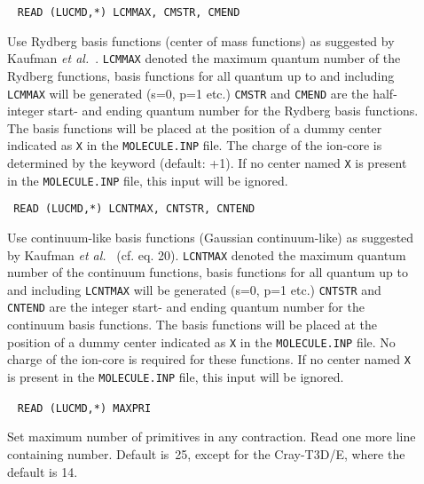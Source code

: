 \begin{description}
\item[]\verb| |\newline
\verb|READ (LUCMD,*) LCMMAX, CMSTR, CMEND|

Use Rydberg basis functions
(center of mass functions) as suggested by
Kaufman {\it et al.\/}~\cite{kkwbmjjpbamop22}. \verb|LCMMAX| denoted
the maximum quantum number of the Rydberg functions, basis functions
for all quantum up to and including \verb|LCMMAX| will be generated
(s=0, p=1 etc.) \verb|CMSTR| and \verb|CMEND| are the half-integer
start- and ending quantum number for the Rydberg basis functions. The
basis functions will be placed at the position of a dummy center
indicated as \verb|X| in the \verb|MOLECULE.INP| file. The charge of
the ion-core is determined by the keyword  (default: +1).
If no center named \verb|X| is present in the \verb|MOLECULE.INP| file,
this input will be ignored.

\item[]\verb| |\newline
\verb|READ (LUCMD,*) LCNTMAX, CNTSTR, CNTEND|

%
%
Use continuum-like basis functions
(Gaussian continuum-like) as suggested by
Kaufman {\it et al.\/}~\cite{kkwbmjjpbamop22} (cf. eq. 20). \verb|LCNTMAX| denoted
the maximum quantum number of the continuum functions, basis functions
for all quantum up to and including \verb|LCNTMAX| will be generated
(s=0, p=1 etc.) \verb|CNTSTR| and \verb|CNTEND| are the integer
start- and ending quantum number for the continuum basis functions. The
basis functions will be placed at the position of a dummy center
indicated as \verb|X| in the \verb|MOLECULE.INP| file. 
No charge of the ion-core is required for these functions.
If no center named \verb|X| is present in the \verb|MOLECULE.INP| file,
this input will be ignored.

\item[]\verb| |\newline
\verb|READ (LUCMD,*) MAXPRI|

Set maximum number of primitives in any
contraction.  Read one more line containing number.  Default
is~25, except for the Cray-T3D/E, where the default is 14.


\end{description}
